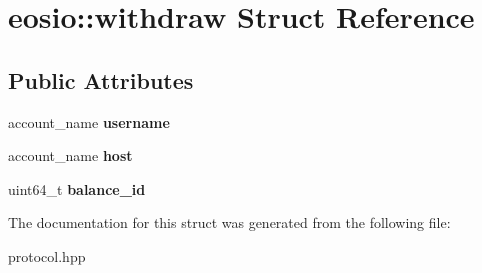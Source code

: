 \hypertarget{structeosio_1_1withdraw}{}\section{eosio\+:\+:withdraw Struct Reference}
\label{structeosio_1_1withdraw}
\subsection*{Public Attributes}
\begin{DoxyCompactItemize}
\item 
\mbox{\label{structeosio_1_1withdraw_a27762de6952a2d466c2a888dbf7e356a}} 
account\+\_\+name {\bfseries username}
\item 
\mbox{\label{structeosio_1_1withdraw_a1da5d9e772825b4db8bbf0513e2ae16f}} 
account\+\_\+name {\bfseries host}
\item 
\mbox{\label{structeosio_1_1withdraw_aa47fcc12665cea0c7afdb3e41aeb5a18}} 
uint64\+\_\+t {\bfseries balance\+\_\+id}
\end{DoxyCompactItemize}


The documentation for this struct was generated from the following file\+:\begin{DoxyCompactItemize}
\item 
protocol.\+hpp\end{DoxyCompactItemize}
